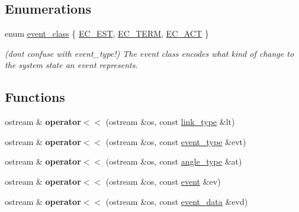 \subsection*{Enumerations}
\begin{DoxyCompactItemize}
\item 
enum \hyperlink{namespacetricl_a6967089e2c0837f273d8cb5fd9f7e46d}{event\+\_\+class} \{ \hyperlink{namespacetricl_a6967089e2c0837f273d8cb5fd9f7e46da928305067790de15396de8fcc92b72b9}{E\+C\+\_\+\+E\+ST}, 
\hyperlink{namespacetricl_a6967089e2c0837f273d8cb5fd9f7e46da16f53be37a75a1cdfc726014c7f3810a}{E\+C\+\_\+\+T\+E\+RM}, 
\hyperlink{namespacetricl_a6967089e2c0837f273d8cb5fd9f7e46dac508c68c92ee059322cb644dd330bbcf}{E\+C\+\_\+\+A\+CT}
 \}\begin{DoxyCompactList}\small\item\em (don\textquotesingle{}t confuse with event\+\_\+type!) The event class encodes what kind of change to the system state an event represents. \end{DoxyCompactList}
\end{DoxyCompactItemize}
\subsection*{Functions}
\begin{DoxyCompactItemize}
\item 
\mbox{\label{namespacetricl_a0c8560d9e6008454c78d640b04cfec39}} 
ostream \& {\bfseries operator$<$$<$} (ostream \&os, const \hyperlink{structtricl_1_1link__type}{link\+\_\+type} \&lt)
\item 
\mbox{\label{namespacetricl_a5d13ae5cc1aee2bdd17da12ffc29738b}} 
ostream \& {\bfseries operator$<$$<$} (ostream \&os, const \hyperlink{structtricl_1_1event__type}{event\+\_\+type} \&evt)
\item 
\mbox{\label{namespacetricl_a9412301333adf45d8ce1059cfaf1adb0}} 
ostream \& {\bfseries operator$<$$<$} (ostream \&os, const \hyperlink{structtricl_1_1angle__type}{angle\+\_\+type} \&at)
\item 
\mbox{\label{namespacetricl_a91e2fc74b8ef15e4fb23e5cab1f67da4}} 
ostream \& {\bfseries operator$<$$<$} (ostream \&os, const \hyperlink{structtricl_1_1event}{event} \&ev)
\item 
\mbox{\label{namespacetricl_a65ebcedfa43301fd5be2b2cf34a4b660}} 
ostream \& {\bfseries operator$<$$<$} (ostream \&os, const \hyperlink{structtricl_1_1event__data}{event\+\_\+data} \&evd)
\end{DoxyCompactItemize}
